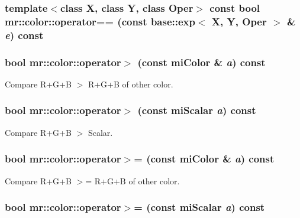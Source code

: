 \subsubsection{\setlength{\rightskip}{0pt plus 5cm}template$<$class X, class Y, class Oper$>$ const bool mr::color::operator== (const {\bf base::exp}$<$ X, Y, Oper $>$ \& {\em e}) const\hspace{0.3cm}{\tt  [inline]}}\label{structmr_1_1color_z10_0}


\subsubsection{\setlength{\rightskip}{0pt plus 5cm}bool mr::color::operator$>$ (const mi\-Color \& {\em a}) const\hspace{0.3cm}{\tt  [inline]}}\label{structmr_1_1color_z11_5}


Compare R+G+B $>$ R+G+B of other color. 

\subsubsection{\setlength{\rightskip}{0pt plus 5cm}bool mr::color::operator$>$ (const mi\-Scalar {\em a}) const\hspace{0.3cm}{\tt  [inline]}}\label{structmr_1_1color_z11_1}


Compare R+G+B $>$ Scalar. 

\subsubsection{\setlength{\rightskip}{0pt plus 5cm}bool mr::color::operator$>$= (const mi\-Color \& {\em a}) const\hspace{0.3cm}{\tt  [inline]}}\label{structmr_1_1color_z11_7}


Compare R+G+B $>$= R+G+B of other color. 

\subsubsection{\setlength{\rightskip}{0pt plus 5cm}bool mr::color::operator$>$= (const mi\-Scalar {\em a}) const\hspace{0.3cm}{\tt  [inline]}}\label{structmr_1_1color_z11_3}


